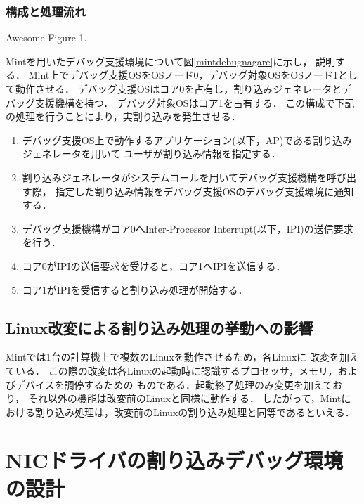 \documentclass[tanilab-enum]{graduate}
\begin{document}
\subsection{構成と処理流れ}
{Awesome Figure 1.}

Mintを用いたデバッグ支援環境について図\ref{mintdebugnagare}に示し，
説明する．
Mint上でデバッグ支援OSをOSノード0，デバッグ対象OSをOSノード1として動作させる．
デバッグ支援OSはコア0を占有し，割り込みジェネレータとデバッグ支援機構を持つ．
デバッグ対象OSはコア1を占有する．
この構成で下記の処理を行うことにより，実割り込みを発生させる．
\begin{enumerate}
    \item 
        デバッグ支援OS上で動作するアプリケーション(以下，AP)である割り込みジェネレータを用いて
        ユーザが割り込み情報を指定する．
        
    \item 
        割り込みジェネレータがシステムコールを用いてデバッグ支援機構を呼び出す際，
        指定した割り込み情報をデバッグ支援OSのデバッグ支援環境に通知する．   
        
    \item 
        デバッグ支援機構がコア0へInter-Processor Interrupt(以下，IPI)の送信要求を行う．
    \item 
        コア0がIPIの送信要求を受けると，コア1へIPIを送信する．
    \item 
        コア1がIPIを受信すると割り込み処理が開始する．
\end{enumerate}
\section{Linux改変による割り込み処理の挙動への影響}
Mintでは1台の計算機上で複数のLinuxを動作させるため，各Linuxに
改変を加えている\cite{kitagawa}．
この際の改変は各Linuxの起動時に認識するプロセッサ，メモリ，およびデバイスを調停するための
ものである．起動終了処理のみ変更を加えており，
それ以外の機能は改変前のLinuxと同様に動作する．
したがって，Mintにおける割り込み処理は，改変前のLinuxの割り込み処理と同等であるといえる．
\chapter{NICドライバの割り込みデバッグ環境の設計}\label{chap:plan}
\end{document}
